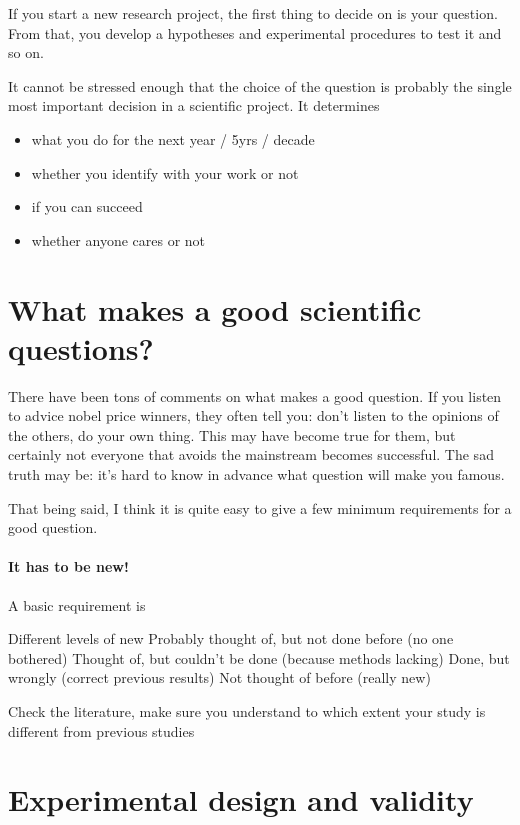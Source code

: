 \documentclass{tufte-book}
\begin{document}
If you start a new research project, the first thing to decide on is your question. From that, you develop a hypotheses and experimental procedures to test it and so on. 

It cannot be stressed enough that the choice of the question is probably the single most important decision in a scientific project. It determines 

\begin{itemize}
\item what you do for the next year / 5yrs / decade
\item whether you identify with your work or not
\item if you can succeed
\item whether anyone cares or not
\end{itemize}


\section{What makes a good scientific questions?}

There have been tons of comments on what makes a good question. If you listen to advice nobel price winners, they often tell you: don't listen to the opinions of the others, do your own thing. This may have become true for them, but certainly not everyone that avoids the mainstream becomes successful. The sad truth may be: it's hard to know in advance what question will make you famous.

That being said, I think it is quite easy to give a few minimum requirements for a good question. 


\paragraph{It has to be new!}A basic requirement is 

Different levels of new
Probably thought of, but not done before (no one bothered)
Thought of, but couldn’t be done (because methods lacking)
Done, but wrongly (correct previous results)
Not thought of before (really new)

Check the literature, make sure you understand to which extent your study is different from previous studies

 



\section{Experimental design and validity}
\end{document}
